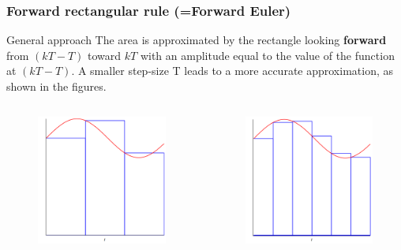 \begin{frame}
	\frametitle{Forward rectangular rule (=Forward Euler)}

	\begin{block}{General approach}
		The area is approximated by the rectangle looking \textbf{forward} from $(kT - T)$ toward $kT$ with an amplitude equal to the value of the function at $(kT - T)$. A smaller step-size T leads to a more accurate approximation, as shown in the figures.
	\end{block}

\begin{columns}
	\begin{column}{0.5\textwidth}
		\begin{figure}
			\centering
			\includegraphics[width=0.6\linewidth]{Forward1}
		\end{figure}
	\end{column}
	
	\begin{column}{0.5\textwidth}
		\begin{figure}
			\centering
			\includegraphics[width=0.6\linewidth]{Forward2}
		\end{figure}
	\end{column}
\end{columns}
\end{frame}

